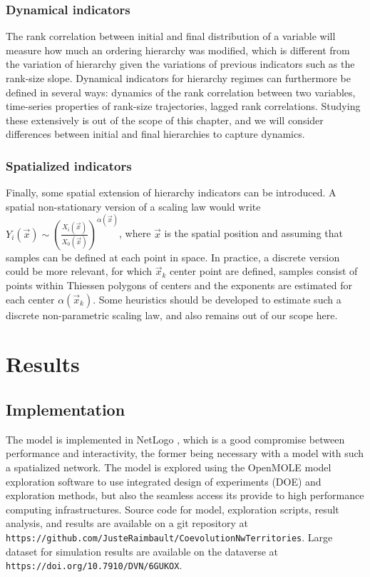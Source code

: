 \documentclass[11pt]{article}
\begin{document}
\subsubsection{Dynamical indicators}

The rank correlation between initial and final distribution of a variable will measure how much an ordering hierarchy was modified, which is different from the variation of hierarchy given the variations of previous indicators such as the rank-size slope. Dynamical indicators for hierarchy regimes can furthermore be defined in several ways: dynamics of the rank correlation between two variables, time-series properties of rank-size trajectories, lagged rank correlations. Studying these extensively is out of the scope of this chapter, and we will consider differences between initial and final hierarchies to capture dynamics.


\subsubsection{Spatialized indicators}

Finally, some spatial extension of hierarchy indicators can be introduced. A spatial non-stationary version of a scaling law would write $Y_i (\vec{x}) \sim \left(\frac{X_i(\vec{x})}{X_0 (\vec{x})}\right)^{\alpha (\vec{x})}$, where $\vec{x}$ is the spatial position and assuming that samples can be defined at each point in space. In practice, a discrete version could be more relevant, for which $\vec{x}_k$ center point are defined, samples consist of points within Thiessen polygons of centers and the exponents are estimated for each center $\alpha (\vec{x}_k)$. Some heuristics should be developed to estimate such a discrete non-parametric scaling law, and also remains out of our scope here.



\section{Results}


\subsection{Implementation}

The model is implemented in NetLogo \cite{tisue2004netlogo}, which is a good compromise between performance and interactivity, the former being necessary with a model with such a spatialized network. The model is explored using the OpenMOLE model exploration software \cite{reuillon2013openmole} to use integrated design of experiments (DOE) and exploration methods, but also the seamless access its provide to high performance computing infrastructures. Source code for model, exploration scripts, result analysis, and results are available on a git repository at \texttt{https://github.com/JusteRaimbault/CoevolutionNwTerritories}. Large dataset for simulation results are available on the dataverse at \texttt{https://doi.org/10.7910/DVN/6GUKOX}.
\end{document}
